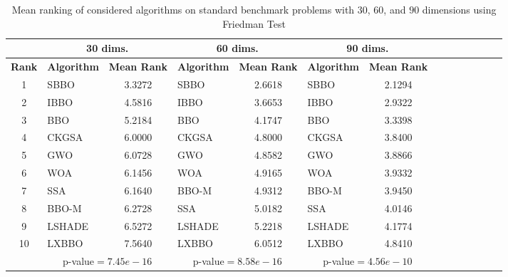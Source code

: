\begin{table}
\scriptsize
\caption[Mean ranking of considered algorithms on standard benchmark problems with $30$, $60$, and $90$ dimensions using Friedman Test]{\fontsize{10pt}{12pt}\selectfont Mean ranking of considered algorithms on standard benchmark problems with $30$, $60$, and $90$ dimensions using Friedman Test}
\centering
{\renewcommand{\arraystretch}{1.3}

\begin{tabular}{ cl cl cl cl cl cl cl}
\hline
& \multicolumn{2}{c}{\textbf{30 dims.}}& \multicolumn{2}{c}{\textbf{60 dims.}}& \multicolumn{2}{c}{\textbf{90 dims.}}\\
\hline
\textbf{Rank} &   \textbf{Algorithm} & \textbf{Mean Rank} &   \textbf{Algorithm} & \textbf{Mean Rank} &   \textbf{Algorithm} & \textbf{Mean Rank}\\
\hline
    
1    &    SBBO    &    3.3272    &    SBBO    &    2.6618    &    SBBO    &    2.1294    \\
2    &    IBBO    &    4.5816    &    IBBO    &    3.6653    &    IBBO    &    2.9322    \\
3    &    BBO    &    5.2184    &    BBO    &    4.1747    &    BBO    &    3.3398    \\
4    &    CKGSA    &    6.0000    &    CKGSA    &    4.8000    &    CKGSA    &    3.8400    \\
5    &    GWO    &    6.0728    &    GWO    &    4.8582    &    GWO    &    3.8866    \\
6    &    WOA    &    6.1456    &    WOA    &    4.9165    &    WOA    &    3.9332    \\
7    &    SSA    &    6.1640    &    BBO-M    &    4.9312    &    BBO-M    &    3.9450    \\
8    &    BBO-M    &    6.2728    &    SSA    &    5.0182    &    SSA    &    4.0146    \\
9    &    LSHADE    &    6.5272    &    LSHADE    &    5.2218    &    LSHADE    &    4.1774    \\
10    &    LXBBO    &    7.5640    &    LXBBO    &    6.0512    &    LXBBO    &    4.8410    \\
\hline
&\multicolumn{2}{c}{p-value$=7.45e-16$}&\multicolumn{2}{c}{p-value$=8.58e-16$}&\multicolumn{2}{c}{p-value$=4.56e-10$}\\
\cline{2-3} \cline{4-5}\cline{6-7}

\end{tabular}}
\label{tab:rankTest1}
\end{table}

